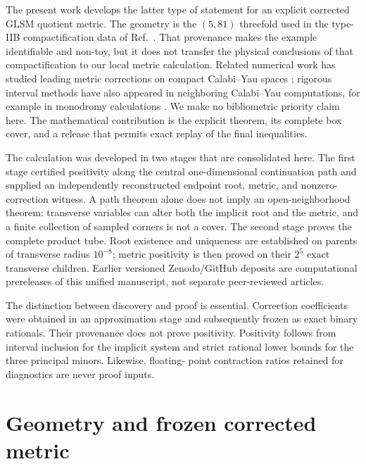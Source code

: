 \documentclass[11pt]{article}
\begin{document}
The present work develops the latter type of statement for an explicit
corrected GLSM quotient metric.  The geometry is the $(5,81)$ threefold used
in the type-IIB compactification data of Ref.~\cite{Demirtas2021}.  That
provenance makes the example identifiable and non-toy, but it does not transfer
the physical conclusions of that compactification to our local metric
calculation.  Related numerical work has studied leading metric corrections
on compact Calabi--Yau spaces \cite{FraserTaliente2024}; rigorous interval
methods have also appeared in neighboring Calabi--Yau computations, for
example in monodromy calculations \cite{Ishige2025}.  We make no bibliometric
priority claim here.  The mathematical contribution is the explicit theorem,
its complete box cover, and a release that permits exact replay of the final
inequalities.

The calculation was developed in two stages that are consolidated here.  The
first stage certified positivity along the central one-dimensional
continuation path and supplied an independently reconstructed endpoint root,
metric, and nonzero-correction witness.  A path theorem alone does not imply an
open-neighborhood theorem: transverse variables can alter both the implicit
root and the metric, and a finite collection of sampled corners is not a
cover.  The second stage proves the complete product tube.  Root existence and
uniqueness are established on parents of transverse radius $10^{-8}$; metric
positivity is then proved on their $2^5$ exact transverse children.  Earlier
versioned Zenodo/GitHub deposits are computational prereleases of this unified
manuscript, not separate peer-reviewed articles.

The distinction between discovery and proof is essential.  Correction
coefficients were obtained in an approximation stage and subsequently frozen
as exact binary rationals.  Their provenance does not prove positivity.
Positivity follows from interval inclusion for the implicit system and strict
rational lower bounds for the three principal minors.  Likewise, floating-
point contraction ratios retained for diagnostics are never proof inputs.

\section{Geometry and frozen corrected metric}
\end{document}
